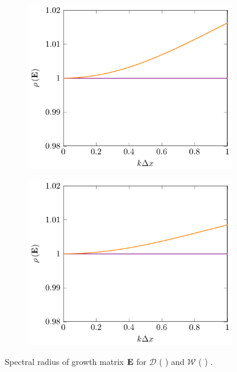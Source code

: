\begin{figure}
	\centering
	\begin{subfigure}{0.5\textwidth}
		\includegraphics[width=\textwidth]{./chp5/figures/stabilityu=1kh0p5.pdf}
	\end{subfigure}%
	\begin{subfigure}{0.5\textwidth}
		\includegraphics[width=\textwidth]{./chp5/figures/stabilityu=1kh2p5.pdf}
	\end{subfigure}
	\caption{Spectral radius of growth matrix $\mathbf{E}$ for $\mathcal{D}$ ({\color{violet!80!white} \solidrule}) and $\mathcal{W}$ ({\color{orange} \solidrule}) .}
	\label{fig:Stabu=1}
\end{figure}


